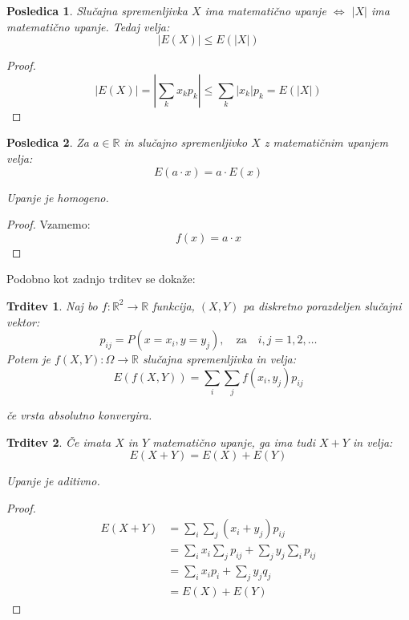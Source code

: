 \documentclass[12pt]{book}
\def\n{\noindent}
\theoremstyle{definition}
\theoremstyle{plain}
\theoremstyle{plain}
\newtheorem{trditev}{Trditev}
\theoremstyle{plain}
\newtheorem{posledica}{Posledica}
\theoremstyle{remark}
\begin{document}
\begin{posledica}
    Slučajna spremenljivka $X$ ima matematično upanje $\iff$ $|X|$ ima matematično upanje. Tedaj velja: 
    $$
    |E(X)| \leq E(|X|)
    $$
\end{posledica}
    
\begin{proof}
    $$
    |E(X)|=\left|\sum_k x_k  p_k \right| \leq \sum_k\left|x_k\right| p_k = E(|X|)
    $$
\end{proof}

\begin{posledica}
    Za $a \in \mathbb{R}$ in slučajno spremenljivko $X$ z matematičnim upanjem velja: 
    $$
    E(a \cdot x)=a \cdot E(x)
    $$

    Upanje je homogeno.
\end{posledica}

\begin{proof}
    Vzamemo: 
    $$
    f(x)=a \cdot x
    $$
\end{proof}

\n Podobno kot zadnjo trditev se dokaže:
\begin{trditev}
    Naj bo $f: \mathbb{R}^2 \to \mathbb{R}$ funkcija, $(X,Y)$ pa diskretno porazdeljen slučajni vektor: 
    $$
    p_{i j}=P\left(x=x_i, y=y_j\right), \quad \text{za} \quad i, j=1,2, \ldots
    $$
    Potem je $f(X, Y): \Omega \to \mathbb{R}$ slučajna spremenljivka in velja: 
    $$
    E(f(X, Y))=\sum_i \sum_j f\left(x_i, y_j\right)  p_{i j}
    $$

    če vrsta absolutno konvergira.
\end{trditev}

\begin{trditev}
    Če imata $X$ in $Y$ matematično upanje, ga ima tudi $X+Y$ in velja: 
    $$
    E(X+Y)=E(X)+E(Y)
    $$

    Upanje je aditivno. 
\end{trditev}

\begin{proof}
    $$
    \begin{aligned}
        E(X+Y)&=\sum_i \sum_j\left(x_i+y_j\right) p_{i j} \\
        &=\sum_i x_i \sum_j p_{i j}+\sum_j y_j \sum_i p_{i j} \\
        &=\sum_i x_i p_i+\sum_j y_j q_j \\
        &=E(X) + E(Y)
    \end{aligned}
    $$
\end{proof}
\end{document}
